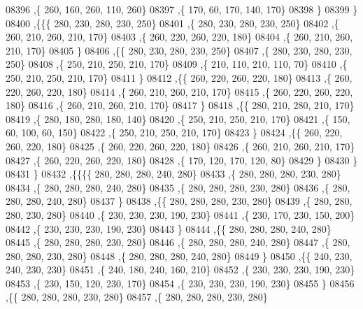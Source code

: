 \begin{DoxyCode}
08396     ,\{   260,   160,   260,   110,   260\}
08397     ,\{   170,    60,   170,   140,   170\}
08398     \}
08399    \}
08400   ,\{\{\{   280,   230,   280,   230,   250\}
08401     ,\{   280,   230,   280,   230,   250\}
08402     ,\{   260,   210,   260,   210,   170\}
08403     ,\{   260,   220,   260,   220,   180\}
08404     ,\{   260,   210,   260,   210,   170\}
08405     \}
08406    ,\{\{   280,   230,   280,   230,   250\}
08407     ,\{   280,   230,   280,   230,   250\}
08408     ,\{   250,   210,   250,   210,   170\}
08409     ,\{   210,   110,   210,   110,    70\}
08410     ,\{   250,   210,   250,   210,   170\}
08411     \}
08412    ,\{\{   260,   220,   260,   220,   180\}
08413     ,\{   260,   220,   260,   220,   180\}
08414     ,\{   260,   210,   260,   210,   170\}
08415     ,\{   260,   220,   260,   220,   180\}
08416     ,\{   260,   210,   260,   210,   170\}
08417     \}
08418    ,\{\{   280,   210,   280,   210,   170\}
08419     ,\{   280,   180,   280,   180,   140\}
08420     ,\{   250,   210,   250,   210,   170\}
08421     ,\{   150,    60,   100,    60,   150\}
08422     ,\{   250,   210,   250,   210,   170\}
08423     \}
08424    ,\{\{   260,   220,   260,   220,   180\}
08425     ,\{   260,   220,   260,   220,   180\}
08426     ,\{   260,   210,   260,   210,   170\}
08427     ,\{   260,   220,   260,   220,   180\}
08428     ,\{   170,   120,   170,   120,    80\}
08429     \}
08430    \}
08431   \}
08432  ,\{\{\{\{   280,   280,   280,   240,   280\}
08433     ,\{   280,   280,   280,   230,   280\}
08434     ,\{   280,   280,   280,   240,   280\}
08435     ,\{   280,   280,   280,   230,   280\}
08436     ,\{   280,   280,   280,   240,   280\}
08437     \}
08438    ,\{\{   280,   280,   280,   230,   280\}
08439     ,\{   280,   280,   280,   230,   280\}
08440     ,\{   230,   230,   230,   190,   230\}
08441     ,\{   230,   170,   230,   150,   200\}
08442     ,\{   230,   230,   230,   190,   230\}
08443     \}
08444    ,\{\{   280,   280,   280,   240,   280\}
08445     ,\{   280,   280,   280,   230,   280\}
08446     ,\{   280,   280,   280,   240,   280\}
08447     ,\{   280,   280,   280,   230,   280\}
08448     ,\{   280,   280,   280,   240,   280\}
08449     \}
08450    ,\{\{   240,   230,   240,   230,   230\}
08451     ,\{   240,   180,   240,   160,   210\}
08452     ,\{   230,   230,   230,   190,   230\}
08453     ,\{   230,   150,   120,   230,   170\}
08454     ,\{   230,   230,   230,   190,   230\}
08455     \}
08456    ,\{\{   280,   280,   280,   230,   280\}
08457     ,\{   280,   280,   280,   230,   280\}

\end{DoxyCode}
